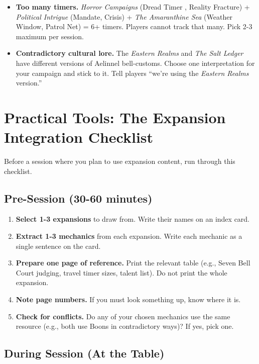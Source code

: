 \begin{itemize}
\item \textbf{Too many timers.} \textit{Horror Campaigns} (Dread Timer , Reality Fracture) + \textit{Political Intrigue} (Mandate, Crisis) + \textit{The Amaranthine Sea} (Weather Window, Patrol Net) = 6+ timers. Players cannot track that many. Pick 2-3 maximum per session.
\item \textbf{Contradictory cultural lore.} The \textit{Eastern Realms} and \textit{The Salt Ledger} have different versions of Aelinnel bell-customs. Choose one interpretation for your campaign and stick to it. Tell players ``we're using the \textit{Eastern Realms} version.''
\end{itemize}

\section{Practical Tools: The Expansion Integration Checklist}

Before a session where you plan to use expansion content, run through this checklist.

\subsection{Pre-Session (30-60 minutes)}

\begin{enumerate}
\item \textbf{Select 1-3 expansions} to draw from. Write their names on an index card.
\item \textbf{Extract 1-3 mechanics} from each expansion. Write each mechanic as a single sentence on the card.
\item \textbf{Prepare one page of reference.} Print the relevant table (e.g., Seven Bell Court judging, travel timer sizes, talent list). Do not print the whole expansion.
\item \textbf{Note page numbers.} If you must look something up, know where it is.
\item \textbf{Check for conflicts.} Do any of your chosen mechanics use the same resource (e.g., both use Boons in contradictory ways)? If yes, pick one.
\end{enumerate}

\subsection{During Session (At the Table)}

